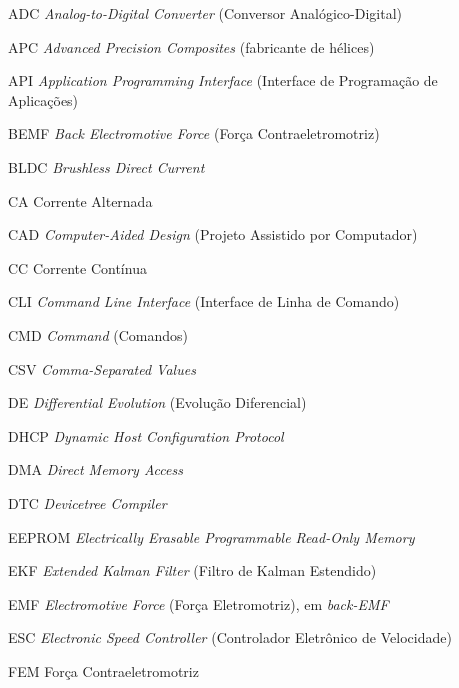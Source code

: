 
\listoffigures*
\cleardoublepage



\listoftables*
\cleardoublepage

\begin{siglas}
	\item[ADC] \textit{Analog-to-Digital Converter} (Conversor Analógico-Digital)
	\item[APC] \textit{Advanced Precision Composites} (fabricante de hélices)
	\item[API] \textit{Application Programming Interface} (Interface de Programação de Aplicações)
	\item[BEMF] \textit{Back Electromotive Force} (Força Contraeletromotriz)
	\item[BLDC] \textit{Brushless Direct Current}
	\item[CA] Corrente Alternada
	\item[CAD] \textit{Computer-Aided Design} (Projeto Assistido por Computador)
	\item[CC] Corrente Contínua
	\item[CLI] \textit{Command Line Interface} (Interface de Linha de Comando)
	\item[CMD] \textit{Command} (Comandos)
	\item[CSV] \textit{Comma-Separated Values}
	\item[DE] \textit{Differential Evolution} (Evolução Diferencial)
	\item[DHCP] \textit{Dynamic Host Configuration Protocol}
	\item[DMA] \textit{Direct Memory Access}
	\item[DTC] \textit{Devicetree Compiler}
	\item[EEPROM] \textit{Electrically Erasable Programmable Read-Only Memory}
	\item[EKF] \textit{Extended Kalman Filter} (Filtro de Kalman Estendido)
	\item[EMF] \textit{Electromotive Force} (Força Eletromotriz), em \textit{back-EMF}
	\item[ESC] \textit{Electronic Speed Controller} (Controlador Eletrônico de Velocidade)
	\item[FEM] Força Contraeletromotriz

\end{siglas}
